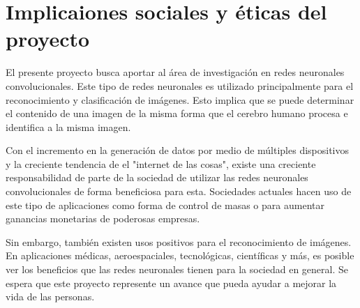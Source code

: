 \chapter{Implicaiones sociales y éticas del proyecto}

El presente proyecto busca aportar al área de investigación en
redes neuronales convolucionales. Este tipo de redes neuronales
es utilizado principalmente para el reconocimiento y clasificación
de imágenes. Esto implica que se puede determinar el contenido
de una imagen de la misma forma que el cerebro humano procesa
e identifica a la misma imagen.

Con el incremento en la generación de datos por medio
de múltiples dispositivos y la creciente tendencia de el "internet de las cosas",
existe una creciente responsabilidad de parte de la sociedad de utilizar
las redes neuronales convolucionales de forma beneficiosa para esta.
Sociedades actuales hacen uso de este tipo de aplicaciones como
forma de control de masas o para aumentar ganancias monetarias de
poderosas empresas.

Sin embargo, también existen usos positivos para el reconocimiento
de imágenes. En aplicaciones médicas, aeroespaciales, tecnológicas,
científicas
y más, es posible ver los beneficios que las redes neuronales tienen
para la sociedad en general. Se espera que este proyecto represente
un avance que pueda ayudar a mejorar la vida de las personas.